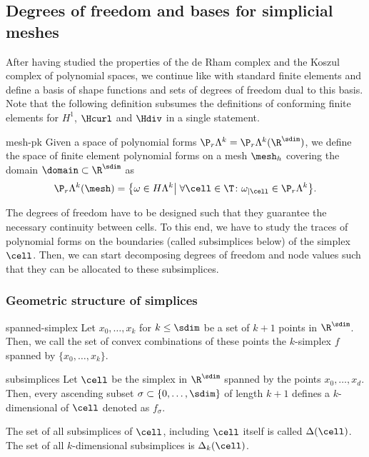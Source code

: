 \subsection{Degrees of freedom and bases for simplicial meshes}

\begin{intro}
  After having studied the properties of the de Rham complex and the
  Koszul complex of polynomial spaces, we continue like with standard
  finite elements and define a basis of shape functions and sets of
  degrees of freedom dual to this basis. Note that the following
  definition subsumes the definitions of conforming finite elements
  for $H^1$, $\Hcurl$ and $\Hdiv$ in a single statement.
\end{intro}

\begin{Definition}{mesh-pk}
  Given a space of polynomial forms
  $\P_r\Lambda^k=\P_r\Lambda^k(\R^\sdim)$, we define the space of finite
  element polynomial forms on a mesh $\mesh_h$ covering the domain
  $\domain\subset\R^\sdim$ as
  \begin{gather}
    \P_r\Lambda^k(\mesh) = \bigl\{
    \omega \in H\Lambda^k \big|
    \;\forall \cell\in\T\colon \omega_{|\cell} \in \P_r\Lambda^k
    \bigr\}.
  \end{gather}
\end{Definition}

\begin{intro}
  The degrees of freedom have to be designed such that they guarantee
  the necessary continuity between cells. To this end, we have to
  study the traces of polynomial forms on the boundaries (called
  subsimplices below) of the simplex $\cell$. Then, we can start
  decomposing degrees of freedom and node values such that they can be
  allocated to these subsimplices.
\end{intro}

\subsubsection{Geometric structure of simplices}

\begin{Definition}{spanned-simplex}
  Let $x_0,\dots,x_k$ for $k\le \sdim$ be a set of $k+1$ points in
  $\R^\sdim$. Then, we call the set of convex combinations of these points
  the $k$-simplex $f$ spanned by $\{x_0,\dots,x_k\}$.
\end{Definition}


\begin{Definition}{subsimplices}
  Let $\cell$ be the simplex in $\R^\sdim$ spanned by the points
  $x_0,\dots,x_d$. Then, every ascending subset
  $\sigma \subset \{0,\dots,\sdim\}$ of length $k+1$ defines a
  $k$-dimensional  of $\cell$ denoted as $f_\sigma$.

  The set of all subsimplices of $\cell$, including $\cell$ itself is
  called $\Delta(\cell)$. The set of all $k$-dimensional subsimplices
  is $\Delta_k(\cell)$.
\end{Definition}

